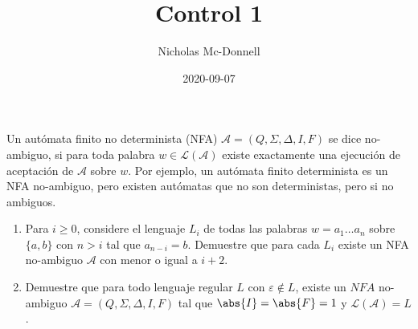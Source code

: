 \documentclass{homework}
\title{Control 1}
\date{2020-09-07}
\author{Nicholas Mc-Donnell}
\begin{document}
\maketitle
\newpage
{}
\begin{p1}
    \begin{prob}
        Un autómata finito no determinista (NFA) \(\mathcal{A}=(Q,\Sigma,\Delta,I,F)\) se dice no-ambiguo, si para toda palabra \(w\in\mathcal{L}(\mathcal{A})\) existe exactamente una ejecución de aceptación de \(\mathcal{A}\) sobre \(w\). Por ejemplo, un autómata finito determinista es un NFA no-ambiguo, pero existen autómatas que no son deterministas, pero si no ambiguos.
        \begin{enumerate}
            \item Para \(i\geq0\), considere el lenguaje \(L_i\) de todas las palabras \(w=a_1\dots a_n\) sobre \(\{a,b\}\) con \(n>i\) tal que \(a_{n-i}=b\). Demuestre que para cada \(L_i\) existe un NFA no-ambiguo \(\mathcal{A}\) con menor o igual a \(i+2\).
            \item Demuestre que para todo lenguaje regular \(L\) con \(\varepsilon\notin L\), existe un \(NFA\) no-ambiguo \(\mathcal{A}=(Q,\Sigma,\Delta,I,F)\) tal que \(\abs{I}=\abs{F}=1\) y \(\mathcal{L}(\mathcal{A})=L\).
        \end{enumerate}
    \end{prob}


\end{p1}
\end{document}
